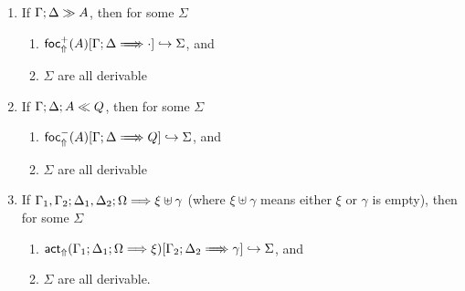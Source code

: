 \begin{lemma}\label{completeness-lemma}
  \begin{enumerate}

  \item If $\Gamma; \Delta \gg A$, then for some $\Sigma$
    \begin{enumerate}
    \item $\relj{\brfrel{A}}{\bneuseq{\Gamma}{\Delta}{\cdot}}{\Sigma}$, and
    \item $\Sigma$ are all derivable
    \end{enumerate}

  \item If $\Gamma; \Delta; A \ll Q$, then for some $\Sigma$
    \begin{enumerate}
    \item $\blfrelj{A}{\bneuseq{\Gamma}{\Delta}{Q}}{\Sigma}$, and
    \item $\Sigma$ are all derivable
    \end{enumerate}

  \item If $\Gamma_1, \Gamma_2; \Delta_1, \Delta_2; \Omega \Longrightarrow \xi \uplus
      \gamma$ (where $\xi \uplus \gamma$ means either $\xi$ or $\gamma$ is
    empty), then for some $\Sigma$
    \begin{enumerate}
    \item
      $\bactrelj{\btriseq{\Gamma_1}{\Delta_1}{\Omega}{\xi}}{\bneuseq{\Gamma_2}{\Delta_2}{\gamma}}{\Sigma}$,
      and
    \item $\Sigma$ are all derivable.
    \end{enumerate}
  \end{enumerate}
\end{lemma}
